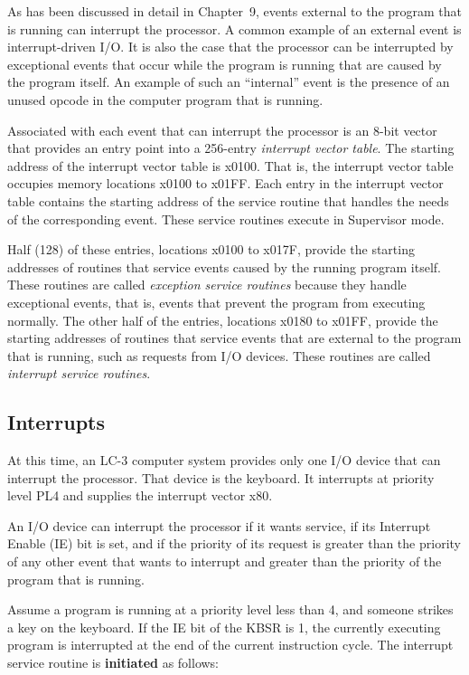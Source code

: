 \documentclass{patt}
\begin{document}
As has been discussed in detail in Chapter~9, events external to the program 
that is running can interrupt the
processor. A common example of an external event is interrupt-driven I/O.
It is also the case that the processor can be interrupted by exceptional
events that occur while the program is running that are caused by the program
itself. An example of such an ``internal'' event is the presence of an unused
opcode in the computer program that is running.

Associated with each event that can interrupt the processor is an 8-bit
vector that provides an entry point into a 256-entry
{\em interrupt vector table}. The starting address of the interrupt vector
table is x0100. That is, the interrupt vector table occupies memory
locations x0100 to x01FF. Each entry in the interrupt vector table contains
the starting address of the service routine that handles the needs of the
corresponding event. These service routines execute in Supervisor mode.

Half (128) of these entries, locations x0100 to x017F, provide the starting
addresses of routines that service events caused by the running program
itself. These routines are called {\em exception service routines} because
they handle exceptional events, that is, events that prevent the program from
executing normally. The other half of the entries, locations x0180
to x01FF, provide the starting addresses of routines that service events that
are external to the program that is running, such as requests from
I/O devices. These routines are called {\em interrupt service routines}.

\subsection{Interrupts}

At this time, an LC-3 computer system provides only one I/O device
that can interrupt the processor. That device is the keyboard.
It interrupts at priority level PL4 and supplies the interrupt vector x80.

An I/O device can interrupt the processor if it wants service, if its
Interrupt Enable
(IE) bit is set, and if the priority of its request is greater than the
priority of any other event that wants to interrupt and greater than the 
priority of the program that is running.

Assume a program is running at a priority level less than 4, and
someone strikes a key on the keyboard. If the IE bit of the KBSR
is 1, the currently executing program is interrupted at the end of the
current instruction cycle. The interrupt service routine is {\bf initiated} as
follows:
\end{document}
